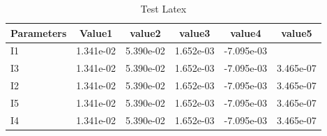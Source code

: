 \documentclass{cernatsnote}
\begin{document}
\begin{table}[h!]
\begin{center}
\caption{\label{fig1} Test Latex}
\begin{tabular}{|l|c|c|c|c|c|}
\hline
Parameters & Value1 & value2 & value3 & value4 & value5 \\ \hline
I1 & 1.341e-02 & 5.390e-02 & 1.652e-03 & -7.095e-03 \\ \hline
I3 & 1.341e-02 & 5.390e-02 & 1.652e-03 & -7.095e-03 & 3.465e-07 \\ \hline
I2 & 1.341e-02 & 5.390e-02 & 1.652e-03 & -7.095e-03 & 3.465e-07 \\ \hline
I5 & 1.341e-02 & 5.390e-02 & 1.652e-03 & -7.095e-03 & 3.465e-07 \\ \hline
I4 & 1.341e-02 & 5.390e-02 & 1.652e-03 & -7.095e-03 & 3.465e-07 \\ \hline
\end{tabular}
\end{center}
\end{table}
\end{document}
